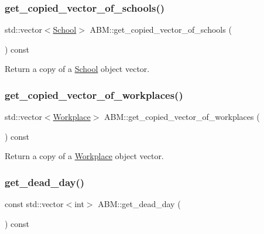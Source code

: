 \subsubsection{\texorpdfstring{get\+\_\+copied\+\_\+vector\+\_\+of\+\_\+schools()}{get\_copied\_vector\_of\_schools()}}
{\footnotesize\ttfamily std\+::vector$<$\hyperlink{classSchool}{School}$>$ A\+B\+M\+::get\+\_\+copied\+\_\+vector\+\_\+of\+\_\+schools (\begin{DoxyParamCaption}{ }\end{DoxyParamCaption}) const\hspace{0.3cm}{\ttfamily [inline]}}



Return a copy of a \hyperlink{classSchool}{School} object vector. 

\mbox{\label{classABM_a8e52715d31aebbd85ea022510a0b654a}} 
\subsubsection{\texorpdfstring{get\+\_\+copied\+\_\+vector\+\_\+of\+\_\+workplaces()}{get\_copied\_vector\_of\_workplaces()}}
{\footnotesize\ttfamily std\+::vector$<$\hyperlink{classWorkplace}{Workplace}$>$ A\+B\+M\+::get\+\_\+copied\+\_\+vector\+\_\+of\+\_\+workplaces (\begin{DoxyParamCaption}{ }\end{DoxyParamCaption}) const\hspace{0.3cm}{\ttfamily [inline]}}



Return a copy of a \hyperlink{classWorkplace}{Workplace} object vector. 

\mbox{\label{classABM_aacf1095e585bcdeedbd637f1462fced9}} 
\subsubsection{\texorpdfstring{get\+\_\+dead\+\_\+day()}{get\_dead\_day()}}
{\footnotesize\ttfamily const std\+::vector$<$int$>$ A\+B\+M\+::get\+\_\+dead\+\_\+day (\begin{DoxyParamCaption}{ }\end{DoxyParamCaption}) const\hspace{0.3cm}{\ttfamily [inline]}}

